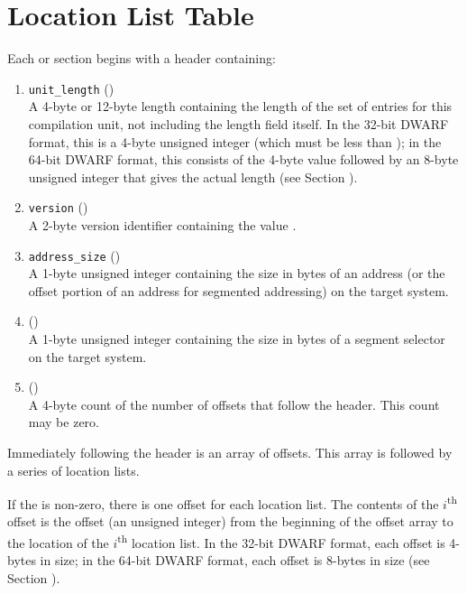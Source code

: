 \section{Location List Table}
\label{datarep:locationlisttable}
Each \dotdebugloclists{} or \dotdebugloclistsdwo{} section 
begins with a header containing:
\begin{enumerate}[1. ]
\item \texttt{unit\_length} () \\
A 4-byte or 12-byte length containing the length of
the set of entries for this compilation unit, not
including the length field itself. In the 32-bit
DWARF format, this is a 4-byte unsigned integer
(which must be less than \xfffffffzero); in the 64-bit
DWARF format, this consists of the 4-byte value
\wffffffff followed by an 8-byte unsigned integer
that gives the actual length (see 
Section ).

\item  \texttt{version} (\HFTuhalf) \\
A 2-byte version identifier containing the value
\versiondotdebugloclists{}.

\item	\texttt{address\_size} (\HFTubyte) \\
A 1-byte unsigned integer containing the size in
bytes of an address (or the offset portion of an
address for segmented addressing) on the target
system.

\item	\HFNsegmentselectorsize{} (\HFTubyte) \\
A 1-byte unsigned integer containing the size in
bytes of a segment selector on the target system.

\item   \HFNoffsetentrycount{} (\HFTuword) \\
A 4-byte count of the number of offsets
that follow the header.
\bb
This count may be zero.
\eb
\end{enumerate}

Immediately following the header is an array of offsets.
This array is followed by a series of location lists. 
    
\bb
If the \HFNoffsetentrycount{} is non-zero, there 
\eb
is one offset for each location list. The contents
of the $i$\textsuperscript{th} offset is the offset 
\bb
(an unsigned integer)
\eb
from the
beginning of the offset array to the location of the 
$i$\textsuperscript{th} location list. 
\bb
In the 32-bit DWARF format, each offset is 4-bytes in size; 
in the 64-bit DWARF format, each offset is 8-bytes in size 
(see Section ).
\eb


